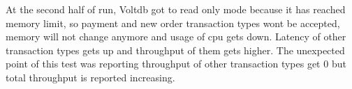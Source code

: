 \documentclass[../../main.tex]{subfiles}
\begin{document}
\begin{minipage}{\textwidth}
    \end{minipage}
    At the second half of run, Voltdb got to read only mode because it has reached memory limit, so payment and new order transaction types wont be accepted, memory will not change anymore and usage of cpu gets down. Latency of other transaction types gets up and throughput of them gets higher.
    The unexpected point of this test was reporting throughput of other transaction types get 0 but total throughput is reported increasing.
    \pagebreak
\end{document}

